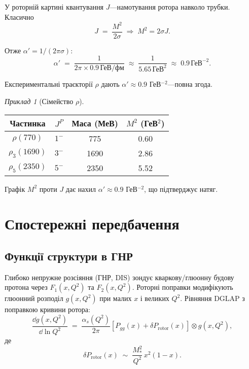 \documentclass[11pt,a4paper]{article}
\theoremstyle{definition}
\theoremstyle{plain}
\theoremstyle{remark}
\newtheorem{example}{Приклад}[section]
\begin{document}
У роторній картині квантування $J$—намотування ротора навколо трубки. Класично
\begin{equation}
J \;=\; \frac{M^2}{2\sigma} \;\Rightarrow\; M^2=2\sigma J.
\end{equation}

Отже $\alpha'=1/(2\pi\sigma)$:
\begin{equation}
\alpha' \;=\; \frac{1}{2\pi \times 0{.}9\,\text{ГеВ/фм}} \;\approx\; \frac{1}{5{.}65\,\text{ГеВ}^2} \;\approx\; \boxed{0{.}9\,\text{ГеВ}^{-2}.}
\label{eq:regge-slope}
\end{equation}

Експериментальні траєкторії $\rho$ дають $\alpha'\approx 0{.}9$ ГеВ$^{-2}$—повна згода.

\begin{example}[Сімейство $\rho$]
\begin{center}
\begin{tabular}{cccc}
\toprule
Частинка & $J^P$ & Маса (МеВ) & $M^2$ (ГеВ$^2$) \\
\midrule
$\rho(770)$    & $1^-$ & 775  & 0{.}60 \\
$\rho_3(1690)$ & $3^-$ & 1690 & 2{.}86 \\
$\rho_5(2350)$ & $5^-$ & 2350 & 5{.}52 \\
\bottomrule
\end{tabular}
\end{center}
Графік $M^2$ проти $J$ дає нахил $\alpha'\approx 0{.}9$ ГеВ$^{-2}$, що підтверджує натяг.
\end{example}

\vspace{1em}

\section{Спостережні передбачення}
\label{sec:observables}

\subsection{Функції структури в ГНР}

Глибоко непружне розсіяння (ГНР, DIS) зондує кваркову/глюонну будову протона через $F_1(x,Q^2)$ та $F_2(x,Q^2)$. Роторні поправки модифікують глюонний розподіл $g(x,Q^2)$ при малих $x$ і великих $Q^2$. Рівняння DGLAP з поправкою кривини ротора:
\begin{equation}
\frac{\dd g(x,Q^2)}{\dd \ln Q^2} \;=\; \frac{\alpha_s(Q^2)}{2\pi}\left[P_{gg}(x) + \delta P_{\mathrm{rotor}}(x)\right] \otimes g(x,Q^2),
\end{equation}
де
\begin{equation}
\delta P_{\mathrm{rotor}}(x) \;\sim\; \frac{M_\ast^2}{Q^2}\,x^2(1-x).
\end{equation}
\end{document}
